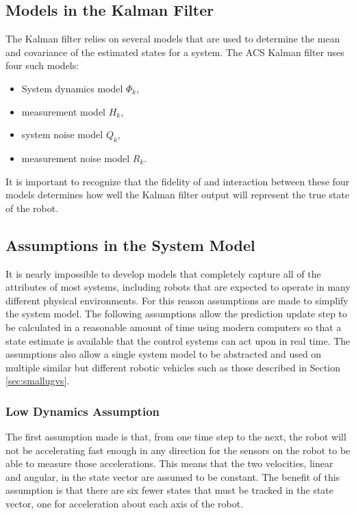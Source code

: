 \subsection{Models in the Kalman Filter}
\label{sec:kfModels}
The Kalman filter relies on several models that are used to determine the mean and covariance of the estimated states for a system. The ACS Kalman filter uses four such models:
\begin{itemize}
\item System dynamics model $\Phi_k$,
\item measurement model $H_k$,
\item system noise model $Q_k$,
\item measurement noise model $R_k$.
\end{itemize}

It is important to recognize that the fidelity of and interaction between these four models determines how well the Kalman filter output will represent the true state of the robot.

\subsection{Assumptions in the System Model}
\label{sec:kfAssumptions}
It is nearly impossible to develop models that completely capture all of the attributes of most systems, including robots that are expected to operate in many different physical environments. For this reason assumptions are made to simplify the system model. The following assumptions allow the prediction update step to be calculated in a reasonable amount of time using modern computers so that a state estimate is available that the control systems can act upon in real time. The assumptions also allow a single system model to be abstracted and used on multiple similar but different robotic vehicles such as those described in Section \ref{sec:smallugvs}.

\subsubsection{Low Dynamics Assumption}
\label{sec:kfLowDynamicsAssumption}
The first assumption made is that, from one time step to the next, the robot will not be accelerating fast enough in any direction for the sensors on the robot to be able to measure those accelerations. This means that the two velocities, linear and angular, in the state vector are assumed to be constant. The benefit of this assumption is that there are six fewer states that must be tracked in the state vector, one for acceleration about each axis of the robot.

